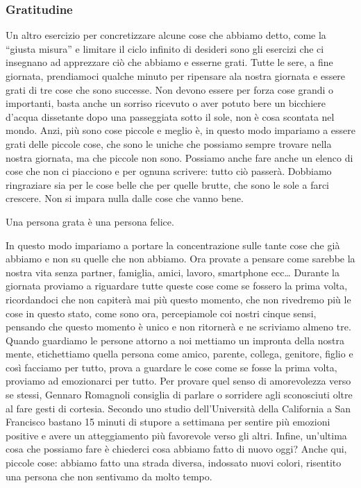 \documentclass[12pt]{book} %
\begin{document}
\subsubsection{Gratitudine}
Un altro esercizio per concretizzare alcune cose che abbiamo detto, come la “giusta misura” e limitare il ciclo infinito
di desideri sono gli esercizi che ci insegnano ad apprezzare ciò che abbiamo e esserne grati. Tutte le sere, a fine
giornata, prendiamoci qualche minuto per ripensare ala nostra giornata e essere grati di tre cose che sono successe.
Non devono essere per forza cose grandi o importanti, basta anche un sorriso ricevuto o aver potuto bere un bicchiere
d'acqua dissetante dopo una passeggiata sotto il sole, non è cosa scontata nel mondo. Anzi, più
sono cose piccole e meglio è, in questo modo impariamo a essere grati delle piccole cose, che sono le uniche che
possiamo sempre trovare nella nostra giornata, ma che piccole non sono. Possiamo anche fare anche un elenco di cose che
non ci piacciono e per ognuna scrivere: tutto ciò passerà. Dobbiamo ringraziare sia per le cose belle che per quelle
brutte, che sono le sole a farci crescere. Non si impara nulla dalle cose che vanno bene. 

Una persona grata è una persona felice. 

In questo modo impariamo a portare la concentrazione sulle tante cose che già abbiamo e non su quelle che non abbiamo.
Ora provate a pensare come sarebbe la nostra vita senza partner, famiglia, amici, lavoro, smartphone ecc… Durante la
giornata proviamo a riguardare tutte queste cose come se fossero la prima volta, ricordandoci che non capiterà mai più
questo momento, che non rivedremo più le cose in questo stato, come sono ora, percepiamole coi nostri cinque sensi,
pensando che questo momento è unico e non ritornerà e ne scriviamo almeno tre. Quando guardiamo le persone attorno a
noi mettiamo un impronta della nostra mente, etichettiamo quella persona come amico, parente, collega, genitore, figlio
e così facciamo per tutto, prova a guardare le cose come se fosse la prima volta, proviamo ad emozionarci per tutto.
Per provare quel senso di amorevolezza verso se stessi, Gennaro Romagnoli consiglia di parlare o sorridere agli
sconosciuti oltre al fare gesti di cortesia. Secondo uno studio dell'Università della California a San Francisco
bastano 15 minuti di {\textquotedbl}stupore{\textquotedbl} a settimana per sentire più emozioni positive e avere un
atteggiamento più favorevole verso gli altri. Infine, un'ultima cosa che possiamo fare è chiederci
cosa abbiamo fatto di nuovo oggi? Anche qui, piccole cose: abbiamo fatto una strada diversa, indossato nuovi colori,
risentito una persona che non sentivamo da molto tempo. 
\end{document}

